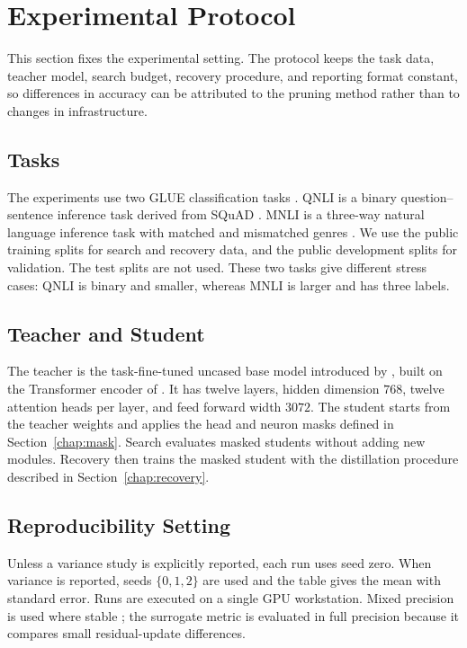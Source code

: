 \section{Experimental Protocol}
\label{chap:protocol}

This section fixes the experimental setting. The protocol keeps the task data, teacher model, search budget, recovery procedure, and reporting format constant, so differences in accuracy can be attributed to the pruning method rather than to changes in infrastructure.

\subsection{Tasks}

The experiments use two GLUE classification tasks \citep{wang2018glue}. QNLI is a binary question--sentence inference task derived from SQuAD \citep{rajpurkar2016squad}. MNLI is a three-way natural language inference task with matched and mismatched genres \citep{williams2018mnli}. We use the public training splits for search and recovery data, and the public development splits for validation. The test splits are not used. These two tasks give different stress cases: QNLI is binary and smaller, whereas MNLI is larger and has three labels.

\subsection{Teacher and Student}

The teacher is the task-fine-tuned uncased base model introduced by \citet{devlin2019bert}, built on the Transformer encoder of \citet{vaswani2017attention}. It has twelve layers, hidden dimension $768$, twelve attention heads per layer, and feed forward width $3072$. The student starts from the teacher weights and applies the head and neuron masks defined in Section~\ref{chap:mask}. Search evaluates masked students without adding new modules. Recovery then trains the masked student with the distillation procedure described in Section~\ref{chap:recovery}.

\subsection{Reproducibility Setting}

Unless a variance study is explicitly reported, each run uses seed zero. When variance is reported, seeds $\{0,1,2\}$ are used and the table gives the mean with standard error. Runs are executed on a single GPU workstation. Mixed precision is used where stable \citep{micikevicius2018mixed}; the surrogate metric is evaluated in full precision because it compares small residual-update differences.

